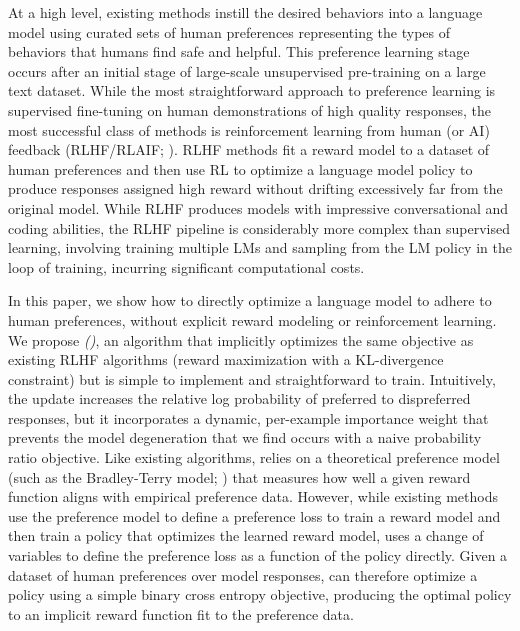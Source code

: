 \documentclass{article}
\newcommand{\rev}[2]{{#2}}
\begin{document}
At a high level, existing methods instill the desired behaviors into a language model using curated sets of human preferences representing the types of behaviors that humans find safe and helpful. This preference learning stage occurs after an initial stage of large-scale unsupervised pre-training on a large text dataset. While the most straightforward approach to preference learning is supervised fine-tuning on human demonstrations of high quality responses, the most successful class of methods is reinforcement learning from human (or AI) feedback (RLHF/RLAIF; \citep{christiano2017deep,bai2022constitutional}). RLHF methods fit a reward model to a dataset of human preferences and then use RL to optimize a language model policy to produce responses assigned high reward without drifting excessively far from the original model. While RLHF produces models with impressive conversational and coding abilities, the RLHF pipeline is considerably more complex than supervised learning, involving training multiple LMs and sampling from the LM policy in the loop of training, incurring significant computational costs.

In this paper, we show how to directly optimize a language model to adhere to human preferences, without explicit reward modeling or reinforcement learning.
We propose
\textit{{\methodfull} (\methodac)}, an algorithm that implicitly optimizes the same objective as existing RLHF algorithms (reward maximization with a KL-divergence constraint) but is simple to implement and straightforward to train. Intuitively, the {\methodac} update increases the relative log probability of preferred to dispreferred responses, but it incorporates a dynamic, per-example importance weight that prevents the model degeneration that we find occurs with a naive probability ratio objective. Like existing algorithms, {\methodac} relies on a theoretical preference model (such as the Bradley-Terry model; \cite{bradley1952rankanalysis}) that measures how well a given reward function aligns with empirical preference data. However, while existing methods use the preference model to define a preference loss to train a reward model and then train a policy that optimizes the learned reward model, {\methodac} uses a change of variables to define the preference loss as a function of the policy directly. Given a dataset of human preferences over model responses, {\methodac} can therefore optimize a policy using a simple binary cross entropy objective, \rev{without learning an explicit, standalone reward model or sampling from the policy during training}{producing the optimal policy to an implicit reward function fit to the preference data}.
\end{document}
